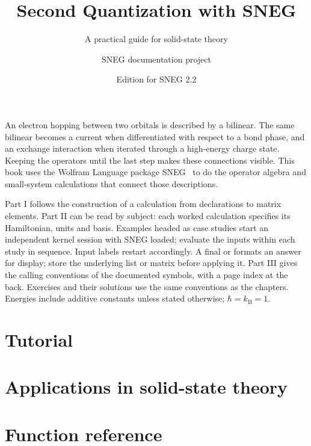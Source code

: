 \documentclass[paper=b5,fontsize=11pt,DIV=11,open=any,headinclude=true,numbers=noenddot]{scrbook}
\begin{document}
\frontmatter
\title{Second Quantization with SNEG}
\subtitle{A practical guide for solid-state theory}
\author{SNEG documentation project}
\date{Edition for SNEG 2.2}
\publishers{\small Licensed under \href{https://creativecommons.org/licenses/by/4.0/}{Creative Commons Attribution 4.0 International}.}
\maketitle
{}
An electron hopping between two orbitals is described by a bilinear.
The same bilinear becomes a current when differentiated with respect to
a bond phase, and an exchange interaction when iterated through a
high-energy charge state. Keeping the operators until the last step
makes these connections visible. This book uses the Wolfram Language
package SNEG~\cite{sneg} to do the operator algebra and small-system
calculations that connect those descriptions.

Part I follows the construction of a calculation from declarations to
matrix elements. Part II can be read by subject: each worked calculation
specifies its Hamiltonian, units and basis. Examples headed as case
studies start an independent kernel session with SNEG loaded; evaluate
the inputs within each study in sequence. Input labels restart accordingly.
A final  or  formats an answer for display;
store the underlying list or matrix before applying it. Part III gives
the calling conventions of the documented symbols, with a page index
at the back. Exercises and their solutions use the same conventions as
the chapters. Energies include additive constants unless stated otherwise;
$\hbar=k_{\mathrm B}=1$.
\setcounter{tocdepth}{1}
\tableofcontents
\mainmatter
\part{Tutorial}







\part{Applications in solid-state theory}







\part{Function reference}
\end{document}
